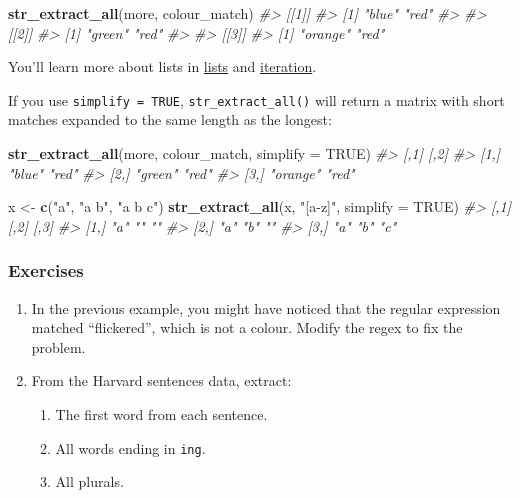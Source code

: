 \documentclass[]{book}
\newenvironment{Shaded}{\begin{snugshade}}{\end{snugshade}}
\newcommand{\KeywordTok}[1]{\textcolor[rgb]{0.13,0.29,0.53}{\textbf{{#1}}}}
\newcommand{\DataTypeTok}[1]{\textcolor[rgb]{0.13,0.29,0.53}{{#1}}}
\newcommand{\StringTok}[1]{\textcolor[rgb]{0.31,0.60,0.02}{{#1}}}
\newcommand{\CommentTok}[1]{\textcolor[rgb]{0.56,0.35,0.01}{\textit{{#1}}}}
\newcommand{\OtherTok}[1]{\textcolor[rgb]{0.56,0.35,0.01}{{#1}}}
\newcommand{\NormalTok}[1]{{#1}}
\providecommand{\tightlist}{%
  \setlength{\itemsep}{0pt}\setlength{\parskip}{0pt}}
\begin{document}
\begin{Shaded}
\begin{Highlighting}[]
\KeywordTok{str_extract_all}\NormalTok{(more, colour_match)}
\CommentTok{#> [[1]]}
\CommentTok{#> [1] "blue" "red" }
\CommentTok{#> }
\CommentTok{#> [[2]]}
\CommentTok{#> [1] "green" "red"  }
\CommentTok{#> }
\CommentTok{#> [[3]]}
\CommentTok{#> [1] "orange" "red"}
\end{Highlighting}
\end{Shaded}

You'll learn more about lists in \protect\hyperlink{lists}{lists} and
\protect\hyperlink{iteration}{iteration}.

If you use \texttt{simplify\ =\ TRUE}, \texttt{str\_extract\_all()} will
return a matrix with short matches expanded to the same length as the
longest:

\begin{Shaded}
\begin{Highlighting}[]
\KeywordTok{str_extract_all}\NormalTok{(more, colour_match, }\DataTypeTok{simplify =} \OtherTok{TRUE}\NormalTok{)}
\CommentTok{#>      [,1]     [,2] }
\CommentTok{#> [1,] "blue"   "red"}
\CommentTok{#> [2,] "green"  "red"}
\CommentTok{#> [3,] "orange" "red"}

\NormalTok{x <-}\StringTok{ }\KeywordTok{c}\NormalTok{(}\StringTok{"a"}\NormalTok{, }\StringTok{"a b"}\NormalTok{, }\StringTok{"a b c"}\NormalTok{)}
\KeywordTok{str_extract_all}\NormalTok{(x, }\StringTok{"[a-z]"}\NormalTok{, }\DataTypeTok{simplify =} \OtherTok{TRUE}\NormalTok{)}
\CommentTok{#>      [,1] [,2] [,3]}
\CommentTok{#> [1,] "a"  ""   ""  }
\CommentTok{#> [2,] "a"  "b"  ""  }
\CommentTok{#> [3,] "a"  "b"  "c"}
\end{Highlighting}
\end{Shaded}

\subsubsection{Exercises}\label{exercises-37}

\begin{enumerate}
\def\labelenumi{\arabic{enumi}.}
\item
  In the previous example, you might have noticed that the regular
  expression matched ``flickered'', which is not a colour. Modify the
  regex to fix the problem.
\item
  From the Harvard sentences data, extract:

  \begin{enumerate}
  \def\labelenumii{\arabic{enumii}.}
  \tightlist
  \item
    The first word from each sentence.
  \item
    All words ending in \texttt{ing}.
  \item
    All plurals.
  \end{enumerate}
\end{enumerate}
\end{document}
